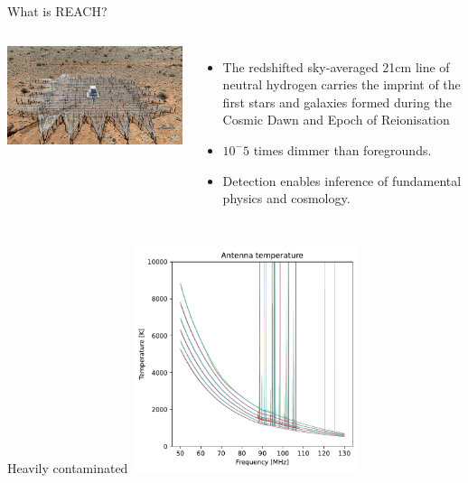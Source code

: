 \documentclass[aspectratio=169]{beamer}
\begin{document}
\begin{frame}{What is REACH?}
  \begin{columns}
      \centering
      \includegraphics[width=1\textwidth]{images/antenna.png} %
      \begin{itemize}
        \item The redshifted sky-averaged 21cm line of neutral hydrogen carries the imprint of the first stars and galaxies formed during the Cosmic Dawn and Epoch of Reionisation
        \item $10^-5$ times dimmer than foregrounds.
        \item Detection enables inference of fundamental physics and cosmology.
      \end{itemize}
  \end{columns}
\end{frame}

\begin{frame}{Heavily contaminated}
  \centering \includegraphics[width=0.5\textwidth]{images/antenna_data_all.pdf}
\end{frame}
\end{document}
